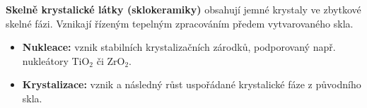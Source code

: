 \textbf{Skelně krystalické látky (sklokeramiky)} obsahují jemné krystaly ve zbytkové skelné fázi. Vznikají řízeným tepelným zpracováním předem vytvarovaného skla.
\begin{itemize}
\item \textbf{Nukleace:} vznik stabilních krystalizačních zárodků, podporovaný např. nukleátory TiO$_2$ či ZrO$_2$.
\item \textbf{Krystalizace:} vznik a následný růst uspořádané krystalické fáze z původního skla.
\end{itemize}
